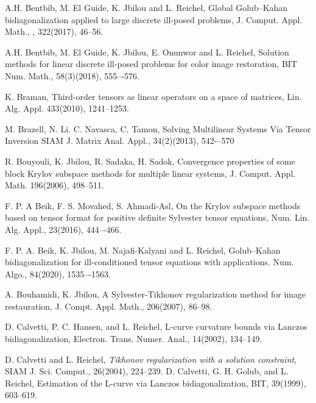\documentclass{siamltex}
\newcommand{\1}{\mathbb{1}}
\newcommand{\0}{\mathbb{0}}
\begin{document}
	\begin{thebibliography}{99}
		A.H.  Bentbib, M. El Guide, K. Jbilou and L. Reichel, Global Golub--Kahan bidiagonalization applied to large discrete ill-posed problems,
		J. Comput. Appl. Math., , 322(2017), 46--56.
		
		A.H. Bentbib, M. El Guide, K. Jbilou, E. Onunwor and L. Reichel, Solution methods for linear discrete ill-posed problems for color image restoration, BIT Num. Math., 58(3)(2018), 555–-576.
		
		K. Braman, Third-order tensors as linear operators on a space of matrices, Lin. Alg. Appl. 433(2010),  1241--1253.
		
		
		
		
		M. Brazell, N. Li. C. Navasca, C. Tamon,  Solving Multilinear Systems Via Tensor Inversion
		SIAM J. Matrix Anal. Appl., 34(2)(2013), 542-–570
		
		R. Bouyouli, K. Jbilou, R. Sadaka, H. Sadok,
		Convergence properties of some block Krylov subspace methods for multiple linear systems, J. Comput. Appl. Math. 196(2006), 498--511.
		
		
		
		
		F. P. A Beik, F. S. Movahed, S. Ahmadi-Asl, On the Krylov subspace methods based on tensor format for positive definite Sylvester tensor equations, Num. Lin. Alg. Appl., 23(2016), 444–-466.
		
		F. P. A. Beik, K. Jbilou, M. Najafi-Kalyani and L. Reichel, Golub–Kahan bidiagonalization for ill-conditioned tensor equations with applications. Num.  Algo.,  84(2020), 1535–-1563.
		
		
		
		A. Bouhamidi, K. Jbilou, A Sylvester-Tikhonov regularization method for image restauration, J. Compt. Appl. Math., 206(2007), 86--98.
		
		
		{ D. Calvetti, P. C. Hansen, and L. Reichel}, { L-curve curvature bounds via Lanczos bidiagonalization}, Electron. Trans. Numer. Anal., 14(2002), 134--149.
		
		{\sc D. Calvetti and L. Reichel}, {\it Tikhonov regularization with a solution 
			constraint}, SIAM J. Sci. Comput., 26(2004),  224--239.
		{D. Calvetti, G. H. Golub, and L. Reichel}, { Estimation of the L-curve via Lanczos 
			bidiagonalization}, BIT, 39(1999), 603--619.
		

\end{thebibliography}
\end{document}
